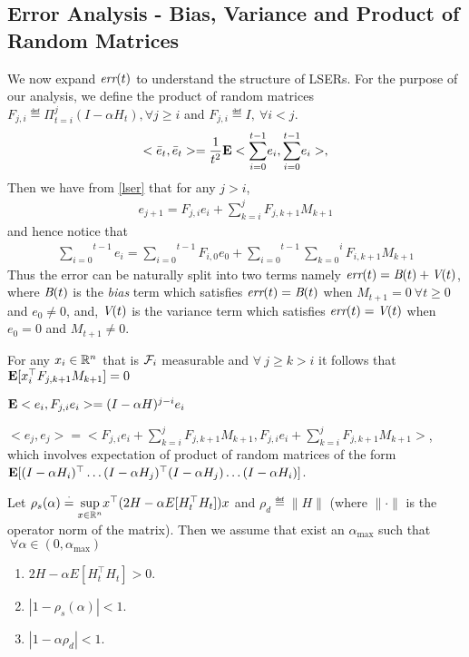 \subsection{Error Analysis - Bias, Variance and Product of Random Matrices}
We now expand $\emph{err}(t)$ to understand the structure of LSERs. For the purpose of our analysis, we define the product of random matrices $F_{j,i}\eqdef\Pi_{t=i}^{j} (I-\alpha H_t), \forall j\geq i$ and $F_{j,i}\eqdef I,~\forall i<j$.
\begin{align}
<\bar{e}_t,\bar{e}_t>=\frac{1}{t^2}\mathbf{E} <\overset{t-1}{\underset{i=0}{\sum}}e_i ,\overset{t-1}{\underset{i=0}{\sum}} e_i>,
\end{align}
Then we have from \eqref{lser} that for any $j>i$,
\begin{align}
e_{j+1}=F_{j,i}e_i + \sum_{k=i}^j F_{j,k+1}M_{k+1}
\end{align} and hence notice that
\begin{align}
\overset{t-1}{\underset{i=0}{\sum}}e_i=\overset{t-1}{\underset{i=0}{\sum}} F_{i,0}e_0+ \overset{t-1}{\underset{i=0}{\sum}} \overset{i}{\underset{k=0}{\sum}} F_{i,k+1}M_{k+1}\end{align} Thus the error can be naturally split into two terms namely $\emph{err}(t)=\emph{B}(t)+\emph{V}(t)$, where $\emph{B}(t)$ is the \emph{bias} term which satisfies $\emph{err}(t)=\emph{B}(t)$ when $M_{t+1}=0~\forall t\geq 0$ and $e_0\neq 0$,  and, $\emph{V}(t)$ is the variance term which satisfies $\emph{err}(t)=\emph{V}(t)$ when $e_0=0$ and $M_{t+1}\neq 0$.
\begin{lemma}
For any $x_i\in \mathbb{R}^n$ that is $\mathcal{F}_i$ measurable and $\forall ~j \geq k> i$ it follows that $\mathbf{E}[x_i^\top F_{j,k+1}M_{k+1}]=0$
\end{lemma}
\begin{lemma}
$\mathbf{E} <e_i,F_{j,i}e_i>=(I-\alpha H)^{j-i}e_i$
\end{lemma}
\begin{remark}
$<e_j,e_j>=<F_{j,i}e_i+\sum_{k=i}^j F_{j,k+1}M_{k+1},F_{j,i}e_i+\sum_{k=i}^j F_{j,k+1}M_{k+1}>$, which involves expectation of product of random matrices of the form
$
\mathbf{E}[(I-\alpha H_i)^\top\ldots (I-\alpha H_j)^\top (I-\alpha H_j)\ldots(I-\alpha H_i)]
$.
\end{remark}
\begin{assumption}
Let $\rho_{s}(\alpha)\stackrel{\cdot}{=} \underset{{x\in \mathbb{R}^n}}{\sup}x^\top (2H-\alpha E[H_t^\top H_t])x $ and $\rho_d\eqdef\parallel H \parallel$ (where $\parallel \cdot\parallel$ is the operator norm of the matrix). Then we assume that exist an $\alpha_{\max}$ such that $~\forall \alpha\in (0,\alpha_{\max})$
\begin{enumerate}[leftmargin=*]
\item $2H- \alpha E[H_t^\top H_t] >0$.
\item $|1-\rho_s(\alpha)|<1$.
\item $|1-\alpha\rho_d|<1$.
\end{enumerate}
\end{assumption}

